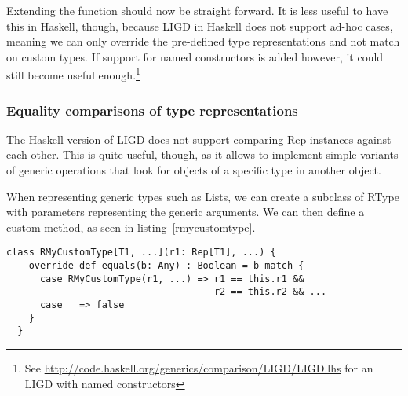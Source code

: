 Extending the function should now be straight forward. It is less useful to
have this in Haskell, though, because LIGD in Haskell does not support ad-hoc
cases, meaning we can only override the pre-defined type representations and not
match on custom types. If support for named constructors is added however, it
could still become useful enough.\footnote{See \url{http://code.haskell.org/generics/comparison/LIGD/LIGD.lhs} for an LIGD with named constructors}

\subsubsection{Equality comparisons of type representations}
The Haskell version of LIGD does not support comparing Rep instances
against each other. This is quite useful, though, as it allows to
implement simple variants of generic operations that look for objects
of a specific type in another object.


When representing generic types such as Lists, we can create a subclass
of RType with parameters representing the generic arguments. We can then
define a custom  method, as seen in listing~\ref{rmycustomtype}.

\begin{lstlisting}[float,caption=Representing custom generic types,label=rmycustomtype]
  class RMyCustomType[T1, ...](r1: Rep[T1], ...) {
    override def equals(b: Any) : Boolean = b match {
      case RMyCustomType(r1, ...) => r1 == this.r1 &&
                                     r2 == this.r2 && ...
      case _ => false
    }
  }
\end{lstlisting}
